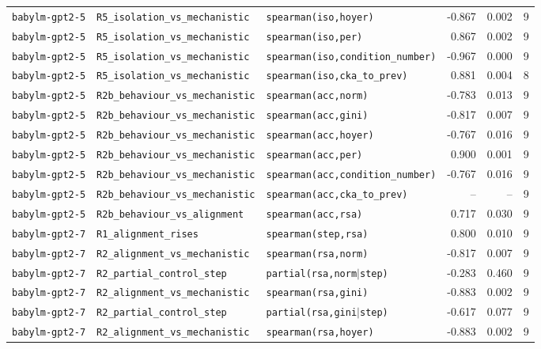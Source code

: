 \begin{longtable}{lllrrr}
\texttt{babylm-gpt2-5} & \texttt{R5\_isolation\_vs\_mechanistic} & \texttt{spearman(iso,hoyer)} & -0.867 & 0.002 & 9 \\
\texttt{babylm-gpt2-5} & \texttt{R5\_isolation\_vs\_mechanistic} & \texttt{spearman(iso,per)} & 0.867 & 0.002 & 9 \\
\texttt{babylm-gpt2-5} & \texttt{R5\_isolation\_vs\_mechanistic} & \texttt{spearman(iso,condition\_number)} & -0.967 & 0.000 & 9 \\
\texttt{babylm-gpt2-5} & \texttt{R5\_isolation\_vs\_mechanistic} & \texttt{spearman(iso,cka\_to\_prev)} & 0.881 & 0.004 & 8 \\
\texttt{babylm-gpt2-5} & \texttt{R2b\_behaviour\_vs\_mechanistic} & \texttt{spearman(acc,norm)} & -0.783 & 0.013 & 9 \\
\texttt{babylm-gpt2-5} & \texttt{R2b\_behaviour\_vs\_mechanistic} & \texttt{spearman(acc,gini)} & -0.817 & 0.007 & 9 \\
\texttt{babylm-gpt2-5} & \texttt{R2b\_behaviour\_vs\_mechanistic} & \texttt{spearman(acc,hoyer)} & -0.767 & 0.016 & 9 \\
\texttt{babylm-gpt2-5} & \texttt{R2b\_behaviour\_vs\_mechanistic} & \texttt{spearman(acc,per)} & 0.900 & 0.001 & 9 \\
\texttt{babylm-gpt2-5} & \texttt{R2b\_behaviour\_vs\_mechanistic} & \texttt{spearman(acc,condition\_number)} & -0.767 & 0.016 & 9 \\
\texttt{babylm-gpt2-5} & \texttt{R2b\_behaviour\_vs\_mechanistic} & \texttt{spearman(acc,cka\_to\_prev)} & -- & -- & 9 \\
\texttt{babylm-gpt2-5} & \texttt{R2b\_behaviour\_vs\_alignment} & \texttt{spearman(acc,rsa)} & 0.717 & 0.030 & 9 \\
\texttt{babylm-gpt2-7} & \texttt{R1\_alignment\_rises} & \texttt{spearman(step,rsa)} & 0.800 & 0.010 & 9 \\
\texttt{babylm-gpt2-7} & \texttt{R2\_alignment\_vs\_mechanistic} & \texttt{spearman(rsa,norm)} & -0.817 & 0.007 & 9 \\
\texttt{babylm-gpt2-7} & \texttt{R2\_partial\_control\_step} & \texttt{partial(rsa,norm$\mid$step)} & -0.283 & 0.460 & 9 \\
\texttt{babylm-gpt2-7} & \texttt{R2\_alignment\_vs\_mechanistic} & \texttt{spearman(rsa,gini)} & -0.883 & 0.002 & 9 \\
\texttt{babylm-gpt2-7} & \texttt{R2\_partial\_control\_step} & \texttt{partial(rsa,gini$\mid$step)} & -0.617 & 0.077 & 9 \\
\texttt{babylm-gpt2-7} & \texttt{R2\_alignment\_vs\_mechanistic} & \texttt{spearman(rsa,hoyer)} & -0.883 & 0.002 & 9 \\

\end{longtable}
